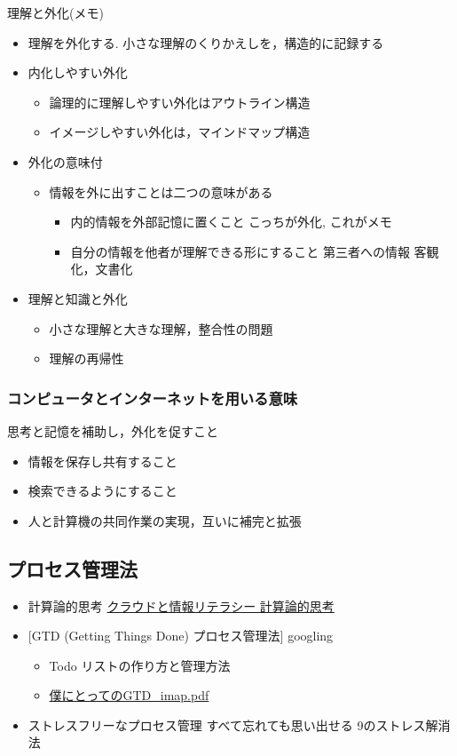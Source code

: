 \documentclass[dvipdfmx,11pat]{jarticle}
\begin{document}
理解と外化(メモ)  
\begin{itemize}
\item 理解を外化する. 小さな理解のくりかえしを，構造的に記録する
\item 内化しやすい外化
\begin{itemize}
\item 論理的に理解しやすい外化はアウトライン構造
\item イメージしやすい外化は，マインドマップ構造
\end{itemize}
\item 外化の意味付
\begin{itemize}
\item 情報を外に出すことは二つの意味がある
\begin{itemize}
\item 内的情報を外部記憶に置くこと
こっちが外化, これがメモ
\item 自分の情報を他者が理解できる形にすること
第三者への情報 客観化，文書化
\end{itemize}
\end{itemize}
\item 理解と知識と外化
\begin{itemize}
\item 小さな理解と大きな理解，整合性の問題
\item 理解の再帰性
\end{itemize}
\end{itemize}
\subsubsection{コンピュータとインターネットを用いる意味}
\label{sec:orgca35644}
思考と記憶を補助し，外化を促すこと
\begin{itemize}
\item 情報を保存し共有すること
\item 検索できるようにすること
\item 人と計算機の共同作業の実現，互いに補完と拡張
\end{itemize}
\subsection{プロセス管理法}
\label{sec:org1939588}
\begin{itemize}
\item 計算論的思考 \href{https://masayuki054.github.io/cloud\_and\_information\_literacy/docs/computational\_thinking.html}{クラウドと情報リテラシー 計算論的思考}
\item {[}GTD (Getting Things Done) プロセス管理法] googling 
\begin{itemize}
\item Todo リストの作り方と管理方法
\item \href{https://masayuki054.github.io/cloud\_and\_information\_literacy/i\_maps/\%E5\%83\%95\%E3\%81\%AB\%E3\%81\%A8\%E3\%81\%A3\%E3\%81\%A6\%E3\%81\%AEGTD\_imap.pdf}{僕にとってのGTD\_imap.pdf}
\end{itemize}
\item ストレスフリーなプロセス管理 すべて忘れても思い出せる
9のストレス解消法
\end{itemize}
\end{document}
